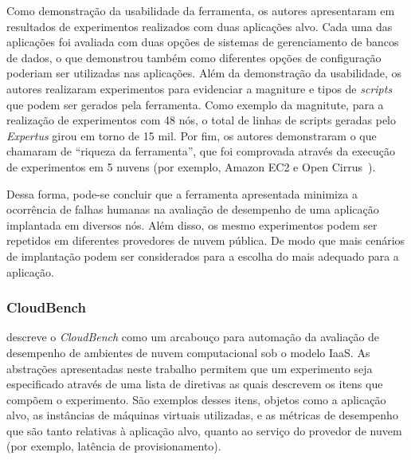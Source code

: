 Como demonstração da usabilidade da ferramenta, os autores apresentaram em~\cite{jayasinghe2012} resultados de experimentos realizados com duas aplicações alvo. Cada uma das aplicações foi avaliada com duas opções de sistemas de gerenciamento de bancos de dados, o que demonstrou também como diferentes opções de configuração poderiam ser utilizadas nas aplicações. Além da demonstração da usabilidade, os autores realizaram experimentos para evidenciar a magniture e tipos de \textit{scripts} que podem ser gerados pela ferramenta. Como exemplo da magnitute, para a realização de experimentos com 48 nós, o total de linhas de scripts geradas pelo \textit{Expertus} girou em torno de 15 mil. Por fim, os autores demonstraram o que chamaram de ``riqueza da ferramenta'', que foi comprovada através da execução de experimentos em 5 nuvens (por exemplo, Amazon EC2 e Open Cirrus~\cite{avetisyan2010open}).

Dessa forma, pode-se concluir que a ferramenta apresentada minimiza a ocorrência de falhas humanas na avaliação de desempenho de uma aplicação implantada em diversos nós. Além disso, os mesmo experimentos podem ser repetidos em diferentes provedores de nuvem pública. De modo que mais cenários de implantação podem ser considerados para a escolha do mais adequado para a aplicação.

\subsubsection{CloudBench}
\cite{silva2013cloudbench} descreve o \textit{CloudBench} como um arcabouço para automação da avaliação de desempenho de ambientes de nuvem computacional sob o modelo IaaS. As abstrações apresentadas neste trabalho permitem que um experimento seja especificado através de uma lista de diretivas as quais descrevem os itens que compõem o experimento. São exemplos desses itens, objetos como a aplicação alvo, as instâncias de máquinas virtuais utilizadas, e as métricas de desempenho que são tanto relativas à aplicação alvo, quanto ao serviço do provedor de nuvem (por exemplo, latência de provisionamento).

